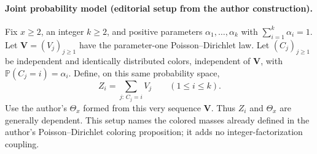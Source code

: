 \paragraph{Joint probability model (editorial setup from the author construction).}
Fix $x\ge 2$, an integer $k\ge 2$, and positive parameters
$\alpha_1,\ldots,\alpha_k$ with $\sum_{i=1}^k\alpha_i=1$.
Let $\mathbf V=(V_j)_{j\ge1}$ have the parameter-one Poisson--Dirichlet law.
Let $(C_j)_{j\ge1}$ be independent and identically distributed colors,
independent of $\mathbf V$, with $\mathbb P(C_j=i)=\alpha_i$.
Define, on this same probability space,
\[
 Z_i=\sum_{j:\,C_j=i}V_j\qquad (1\le i\le k).
\]
Use the author's $\Theta_x$ formed from this very sequence $\mathbf V$.
Thus $Z_i$ and $\Theta_x$ are generally dependent.
This setup names the colored masses already defined in the author's
Poisson--Dirichlet coloring proposition; it adds no integer-factorization coupling.
